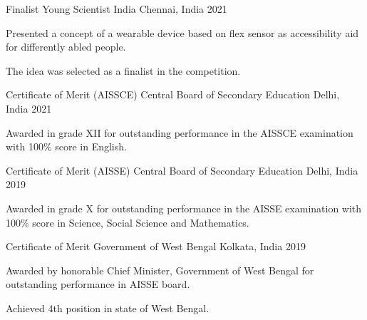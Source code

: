 \begin{cventries}
  \cventry
  {Finalist} %
  {Young Scientist India} %
  {Chennai, India} %
  {2021} %
  {
    \begin{cvitems}
      \item Presented a concept of a wearable device based on flex sensor as accessibility aid for differently abled people.
      \item The idea was selected as a finalist in the competition. 
    \end{cvitems}
  }
  
  \cventry
  {Certificate of Merit (AISSCE)} %
  {Central Board of Secondary Education} %
  {Delhi, India} %
  {2021} %
  {
    \begin{cvitems}
      \item Awarded in grade XII for outstanding performance in the AISSCE examination with 100\% score in English.  
    \end{cvitems}
  }

  \cventry
  {Certificate of Merit (AISSE)} %
  {Central Board of Secondary Education} %
  {Delhi, India} %
  {2019} %
  {
    \begin{cvitems}
      \item Awarded in grade X for outstanding performance in the AISSE examination with 100\% score in Science, Social Science and Mathematics.  
    \end{cvitems}
  }

  \cventry
  {Certificate of Merit} %
  {Government of West Bengal} %
  {Kolkata, India} %
  {2019} %
  {
    \begin{cvitems}
      \item Awarded by honorable Chief Minister, Government of West Bengal for outstanding performance in AISSE board.
      \item Achieved 4th position in state of West Bengal.  
    \end{cvitems}
  }
\end{cventries}




